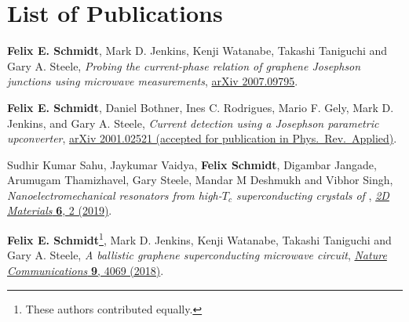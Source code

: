 \chapter*{List of Publications}
\label{publications}

\renewcommand*{\thefootnote}{\fnsymbol{footnote}}
\setcounter{footnote}{0}

\begin{etaremune}{\small


\item \textbf{Felix E. Schmidt}, Mark D. Jenkins, Kenji Watanabe, Takashi Taniguchi and Gary A. Steele, \textit{Probing the current-phase relation of graphene Josephson junctions using microwave measurements}, \href{https://arxiv.org/abs/2007.09795}{arXiv 2007.09795}.

\item \textbf{Felix E. Schmidt}, Daniel Bothner, Ines C. Rodrigues, Mario F. Gely, Mark D. Jenkins, and Gary A. Steele, \textit{Current detection using a Josephson parametric upconverter}, \href{https://arxiv.org/abs/2001.02521}{arXiv 2001.02521 (accepted for publication in Phys.~Rev.~Applied)}.

\item Sudhir Kumar Sahu, Jaykumar Vaidya, \textbf{Felix Schmidt}, Digambar Jangade, Arumugam Thamizhavel, Gary Steele, Mandar M Deshmukh and Vibhor Singh, \textit{Nanoelectromechanical resonators from high-$T_c$ superconducting crystals of }, \href{https://doi.org/10.1088/2053-1583/ab0800}{\textit{2D Materials} \textbf{6}, 2 (2019)}.

\item \textbf{Felix E. Schmidt}\footnote{\label{foot:equal}These authors contributed equally.}, Mark D. Jenkins, Kenji Watanabe, Takashi Taniguchi and Gary A. Steele, \textit{A ballistic graphene superconducting microwave circuit}, \href{https://doi.org/10.1038/s41467-018-06595-2}{\textit{Nature Communications} \textbf{9}, 4069 (2018)}.

}\end{etaremune}

\renewcommand*{\thefootnote}{\arabic{footnote}}
